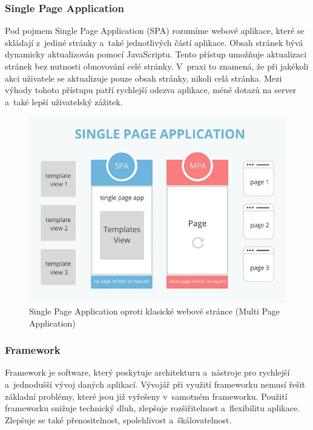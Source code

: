 \subsubsection*{Single Page Application}

Pod pojmem Single Page Application (SPA) rozumíme webové aplikace, které se skládají z~jediné stránky a~také jednotlivých částí aplikace. 
Obsah stránek bývá dynamicky aktualizován pomocí JavaScriptu. Tento přístup umožňuje aktualizaci stránek bez nutnosti obnovování celé stránky. 
V~praxi to znamená, že při jakékoli akci uživatele se aktualizuje pouze obsah stránky, nikoli celá stránka. 
Mezi výhody tohoto přístupu patří rychlejší odezva aplikace, méně dotazů na server a~také lepší uživatelský zážitek.\cite{jadhavspa}

\begin{figure}[htb]
	\centering
		\includegraphics[width=.75\textwidth]{images/SPAvsMPA.jpg}
	\caption[Single Page Application oproti klasické webové stránce (Multi Page Application)]{Single Page Application oproti klasické webové stránce (Multi Page Application) \cite{fergusonspavsmpa}}
	\label{fig:spavsmpa}
\end{figure}

\subsubsection*{Framework}

Framework je software, který poskytuje architekturu a~nástroje pro rychlejší a~jednodušší vývoj daných aplikací. 
Vývojář při využití frameworku nemusí řešit základní problémy, které jsou již vyřešeny v~samotném frameworku. 
Použití frameworku snižuje technický dluh, zlepšuje rozšiřitelnost a~flexibilitu aplikace. 
Zlepšuje se také přenositelnost, spolehlivost a~škálovatelnost.\cite{schmidtframeworks}